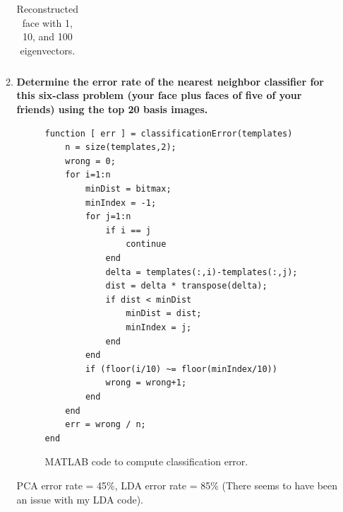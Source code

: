 \documentclass[12pt]{article}
\begin{document}
\begin{enumerate}
\begin{enumerate}
\begin{table}[H]
\begin{tabular}{cccc}
\end{tabular}
\caption{Reconstructed face with 1, 10, and 100 eigenvectors.}
\end{table}
\item \textbf{Determine the error rate of the nearest neighbor classiﬁer for this six-class problem (your face plus faces of five of your friends) using the top 20 basis images.}
\begin{figure}[H]
\begin{verbatim}
function [ err ] = classificationError(templates)
    n = size(templates,2);
    wrong = 0;
    for i=1:n
        minDist = bitmax;
        minIndex = -1;
        for j=1:n
            if i == j
                continue
            end
            delta = templates(:,i)-templates(:,j);
            dist = delta * transpose(delta);
            if dist < minDist
                minDist = dist;
                minIndex = j;
            end
        end
        if (floor(i/10) ~= floor(minIndex/10))
            wrong = wrong+1;
        end
    end
    err = wrong / n;
end
\end{verbatim}
\caption{MATLAB code to compute classification error.}
\end{figure}
PCA error rate = 45\%, LDA error rate = 85\% (There seems to have been an issue with my LDA code).
\end{enumerate}
\end{enumerate}
\end{document}
